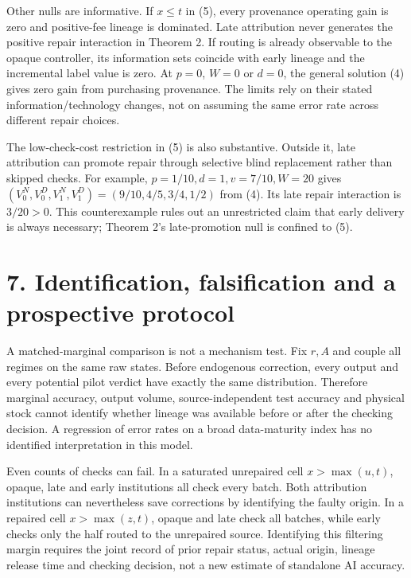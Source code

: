 \documentclass[
  11pt,
  a4paper,
]{article}
\begin{document}
Other nulls are informative. If \(x\leq t\) in (5), every provenance
operating gain is zero and positive-fee lineage is dominated. Late
attribution never generates the positive repair interaction in Theorem
2. If routing is already observable to the opaque controller, its
information sets coincide with early lineage and the incremental label
value is zero. At \(p=0\), \(W=0\) or \(d=0\), the general solution (4)
gives zero gain from purchasing provenance. The limits rely on their
stated information/technology changes, not on assuming the same error
rate across different repair choices.

The low-check-cost restriction in (5) is also substantive. Outside it,
late attribution can promote repair through selective blind replacement
rather than skipped checks. For example, \(p=1/10,d=1,v=7/10,W=20\)
gives \((V_0^N,V_0^D,V_1^N,V_1^D)=(9/10,4/5,3/4,1/2)\) from (4). Its
late repair interaction is \(3/20>0\). This counterexample rules out an
unrestricted claim that early delivery is always necessary; Theorem 2's
late-promotion null is confined to (5).

\section{7. Identification, falsification and a prospective
protocol}\label{identification-falsification-and-a-prospective-protocol}

A matched-marginal comparison is not a mechanism test. Fix \(r,A\) and
couple all regimes on the same raw states. Before endogenous correction,
every output and every potential pilot verdict have exactly the same
distribution. Therefore marginal accuracy, output volume,
source-independent test accuracy and physical stock cannot identify
whether lineage was available before or after the checking decision. A
regression of error rates on a broad data-maturity index has no
identified interpretation in this model.

Even counts of checks can fail. In a saturated unrepaired cell
\(x>\max(u,t)\), opaque, late and early institutions all check every
batch. Both attribution institutions can nevertheless save corrections
by identifying the faulty origin. In a repaired cell \(x>\max(z,t)\),
opaque and late check all batches, while early checks only the half
routed to the unrepaired source. Identifying this filtering margin
requires the joint record of prior repair status, actual origin, lineage
release time and checking decision, not a new estimate of standalone AI
accuracy.
\end{document}
